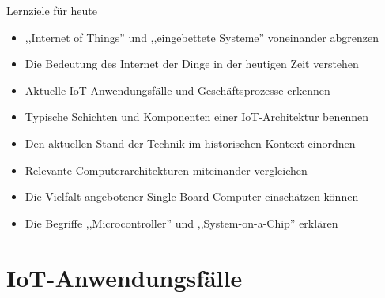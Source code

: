 \begin{frame}{Lernziele für heute}
    \begin{itemize}
        \item ,,Internet of Things'' und ,,eingebettete Systeme'' voneinander abgrenzen
        \item Die Bedeutung des Internet der Dinge in der heutigen Zeit verstehen
        \item Aktuelle IoT-Anwendungsfälle und Geschäftsprozesse erkennen
        \item Typische Schichten und Komponenten einer IoT-Architektur benennen
        \item Den aktuellen Stand der Technik im historischen Kontext einordnen
        \item Relevante Computerarchitekturen miteinander vergleichen
        \item Die Vielfalt angebotener Single Board Computer einschätzen können
        \item Die Begriffe ,,Microcontroller'' und ,,System-on-a-Chip'' erklären
    \end{itemize}
\end{frame}

\section{IoT-Anwendungsfälle}

